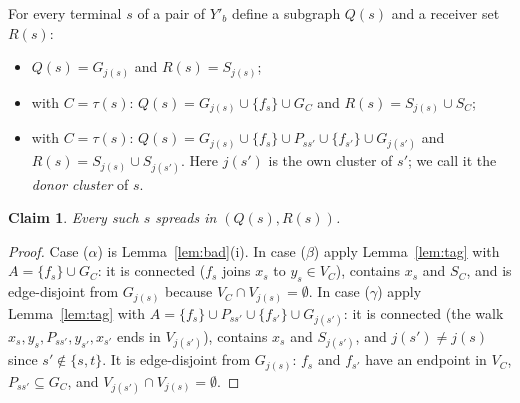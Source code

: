 \documentclass[11pt,letterpaper]{article}
\newtheorem{claim}{Claim}
\theoremstyle{definition}
\begin{document}
For every terminal $s$ of a pair of $Y'_b$ define a subgraph $Q(s)$ and a receiver set $R(s)$:
\begin{itemize}[nosep]
\item[($\alpha$)] $Q(s)=G_{j(s)}$ and $R(s)=S_{j(s)}$;
\item[($\beta$)] with $C=\tau(s)$: $Q(s)=G_{j(s)}\cup\{f_s\}\cup G_C$ and
$R(s)=S_{j(s)}\cup S_C$;
\item[($\gamma$)] with $C=\tau(s)$: $Q(s)=G_{j(s)}\cup\{f_s\}\cup P_{ss'}\cup\{f_{s'}\}\cup
G_{j(s')}$ and $R(s)=S_{j(s)}\cup S_{j(s')}$. Here $j(s')$ is the own cluster of $s'$; we call it
the \emph{donor cluster} of $s$.
\end{itemize}

\begin{claim}\label{cl:spread}
Every such $s$ spreads in $(Q(s),R(s))$.
\end{claim}
\begin{proof}
Case ($\alpha$) is Lemma~\ref{lem:bad}(i). In case ($\beta$) apply Lemma~\ref{lem:tag} with
$A=\{f_s\}\cup G_C$: it is connected ($f_s$ joins $x_s$ to $y_s\in V_C$), contains $x_s$ and
$S_C$, and is edge-disjoint from $G_{j(s)}$ because $V_C\cap V_{j(s)}=\emptyset$. In case
($\gamma$) apply Lemma~\ref{lem:tag} with $A=\{f_s\}\cup P_{ss'}\cup\{f_{s'}\}\cup G_{j(s')}$:
it is connected (the walk $x_s,y_s,P_{ss'},y_{s'},x_{s'}$ ends in $V_{j(s')}$), contains $x_s$
and $S_{j(s')}$, and $j(s')\ne j(s)$ since $s'\notin\{s,t\}$. It is edge-disjoint from
$G_{j(s)}$: $f_s$ and $f_{s'}$ have an endpoint in $V_C$, $P_{ss'}\subseteq G_C$, and
$V_{j(s')}\cap V_{j(s)}=\emptyset$.
\end{proof}
\end{document}
